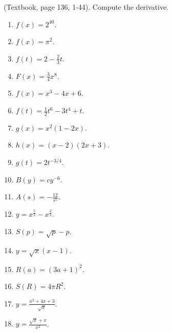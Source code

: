 \begin{problem} (Textbook, page 136, 1-44).
Compute the derivative.
\begin{multicols}{2}
\begin{enumerate}
\item $f(x)=2^{40}$.

\item $f(x)=\pi^2$.

\item $f(t)=2-\frac{2}{3}t$.

\item $F(x)=\frac{3}{4}x^8$.

\item $f(x)=x^3-4x+6$.

\item $f(t)=\frac{1}{2}t^6-3t^4+t$.

\item $g(x)=x^2(1-2x)$. 

\item $h(x)=(x-2)(2x+3)$.

\item $g(t)=2t^{-3/4}$.

\item $B(y)=c y^{-6}$.

\item $A(s)=-\frac{12}{s^5}$.

\item $y=x^{\frac53}-x^{\frac23}$.

\item $S(p)=\sqrt{p}-p$.

\item $y=\sqrt{x}(x-1)$.

\item $R(a)=(3a+1)^2$.

\item $S(R)=4\pi R^2$.

\item $y=\frac{ x^2+4x+3}{\sqrt{x}}$.

\item $y=\frac{\sqrt{x}+x}{x^2}$.


\end{enumerate}
\end{multicols}
\end{problem}
